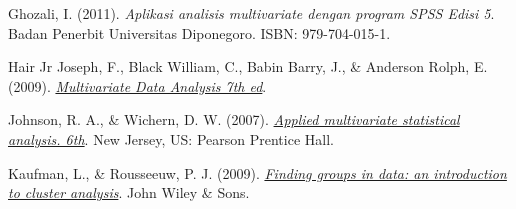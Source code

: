 \documentclass{laporanta1statugm}
\begin{document}
\cover

\newpage{}
\tableofcontents







\begin{thebibliography}{99}

Ghozali, I. (2011). \emph{Aplikasi analisis multivariate dengan program SPSS Edisi 5}. Badan Penerbit Universitas Diponegoro. ISBN: 979-704-015-1.

Hair Jr Joseph, F., Black William, C., Babin Barry, J., \& Anderson Rolph, E. (2009). \href{https://www.drnishikantjha.com/papersCollection/Multivariate%20Data%20Analysis.pdf}{\emph{Multivariate Data Analysis 7th ed}}.

Johnson, R. A., \& Wichern, D. W. (2007). \href{https://www.webpages.uidaho.edu/~stevel/519/Applied%20Multivariate%20Statistical%20Analysis%20by%20Johnson%20and%20Wichern.pdf.}{\emph{Applied multivariate statistical analysis. 6th}}. New Jersey, US: Pearson Prentice Hall. 

Kaufman, L., \& Rousseeuw, P. J. (2009). \href{https://www.researchgate.net/publication/220695963_Finding_Groups_in_Data_An_Introduction_To_Cluster_Analysis.}{\emph{Finding groups in data: an introduction to cluster analysis}}. John Wiley \& Sons.


\end{thebibliography}
\end{document}
